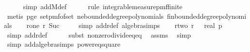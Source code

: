 \begin{isabellebody}
\ \ \ \ \isamarkupfalse%
\ {\isacharparenleft}{\kern0pt}simp\ add{\isacharcolon}{\kern0pt}M{\isacharunderscore}{\kern0pt}def{\isacharparenright}{\kern0pt}\isanewline
\ \ \ \ \isamarkupfalse%
\ {\isacharparenleft}{\kern0pt}rule\ integrable{\isacharunderscore}{\kern0pt}measure{\isacharunderscore}{\kern0pt}pmf{\isacharunderscore}{\kern0pt}finite{\isacharparenright}{\kern0pt}\isanewline
\ \ \ \ \isamarkupfalse%
\ {\isacharparenleft}{\kern0pt}metis\ p{\isacharunderscore}{\kern0pt}ge{\isacharunderscore}{\kern0pt}{}\ set{\isacharunderscore}{\kern0pt}pmf{\isacharunderscore}{\kern0pt}of{\isacharunderscore}{\kern0pt}set\ ne{\isacharunderscore}{\kern0pt}bounded{\isacharunderscore}{\kern0pt}degree{\isacharunderscore}{\kern0pt}polynomials\ fin{\isacharunderscore}{\kern0pt}bounded{\isacharunderscore}{\kern0pt}degree{\isacharunderscore}{\kern0pt}polynomials{\isacharparenright}{\kern0pt}\isanewline
\isanewline
\ \ \isamarkupfalse%
\ r{\isacharunderscore}{\kern0pt}one{\isacharcolon}{\kern0pt}\ {\isachardoublequoteopen}r\ {\isacharparenleft}{\kern0pt}Suc\ {}{\isacharparenright}{\kern0pt}\ {\isacharequal}{\kern0pt}\ {}{\isachardoublequoteclose}\ \isamarkupfalse%
\ {\isacharparenleft}{\kern0pt}simp\ add{\isacharcolon}{\kern0pt}r{\isacharunderscore}{\kern0pt}def\ algebra{\isacharunderscore}{\kern0pt}simps{\isacharparenright}{\kern0pt}\isanewline
\isanewline
\ \ \isamarkupfalse%
\ r{\isacharunderscore}{\kern0pt}two{\isacharcolon}{\kern0pt}\ {\isachardoublequoteopen}r\ {}\ {\isacharequal}{\kern0pt}\ {\isacharparenleft}{\kern0pt}real\ p{\isacharcircum}{\kern0pt}{}{\isacharminus}{\kern0pt}{}{\isacharparenright}{\kern0pt}{\isachardoublequoteclose}\isanewline
\ \ \ \ \isamarkupfalse%
\ {\isacharparenleft}{\kern0pt}simp\ add{\isacharcolon}{\kern0pt}r{\isacharunderscore}{\kern0pt}def{\isacharparenright}{\kern0pt}\isanewline
\ \ \ \ \isamarkupfalse%
\ {\isacharparenleft}{\kern0pt}subst\ nonzero{\isacharunderscore}{\kern0pt}divide{\isacharunderscore}{\kern0pt}eq{\isacharunderscore}{\kern0pt}eq{\isacharparenright}{\kern0pt}\ \isamarkupfalse%
\ assms\ \isamarkupfalse%
\ simp\isanewline
\ \ \ \ \isamarkupfalse%
\ {\isacharparenleft}{\kern0pt}simp\ add{\isacharcolon}{\kern0pt}algebra{\isacharunderscore}{\kern0pt}simps\ power{}{\isacharunderscore}{\kern0pt}eq{\isacharunderscore}{\kern0pt}square{\isacharparenright}{\kern0pt}\isanewline

\end{isabellebody}
